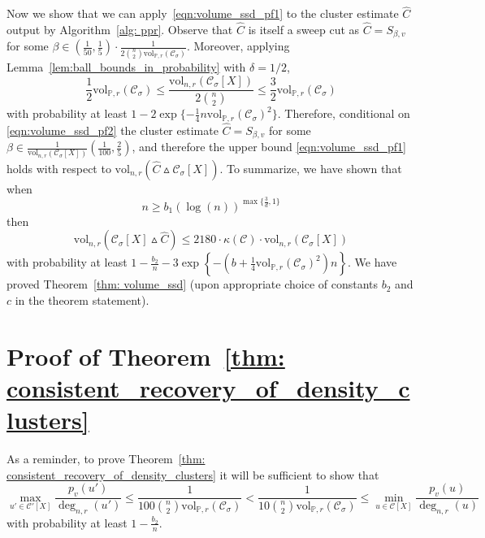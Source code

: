 \documentclass[11pt,twoside]{article}
\theoremstyle{definition}
\newcommand{\set}[1]{\left\{#1\right\}}
\newcommand{\vol}{\mathrm{vol}}
\newcommand{\1}{\mathbbm{1}}
\newcommand{\Xbf}{X}
\newcommand{\Pbb}{\mathbb{P}}
\newcommand{\Cset}{\mathcal{C}}
\newcommand{\Csig}{\Cset_{\sigma}}
\newcommand{\Cest}{\widehat{C}}
\begin{document}
Now we show that we can apply~\eqref{eqn:volume_ssd_pf1} to the cluster estimate $\Cest$ output by Algorithm~\ref{alg: ppr}. Observe that $\Cest$ is itself a sweep cut as $\Cest = S_{\beta,v}$ for some $\beta \in \left(\frac{1}{50},\frac{1}{5}\right)\cdot\frac{1}{2{n \choose 2}\vol_{\Pbb,r}(\Csig)}$. Moreover, applying  Lemma~\ref{lem:ball_bounds_in_probability} with $\delta = 1/2$,
\begin{equation}
\label{eqn:volume_ssd_pf2}
\frac{1}{2}\vol_{\Pbb,r}(\Csig) \leq \frac{\vol_{n,r}(\Csig[\Xbf])}{2{n \choose 2}} \leq \frac{3}{2}\vol_{\Pbb,r}(\Csig)
\end{equation}
with probability at least $1 - 2\exp\{-\frac{1}{4} n \vol_{\Pbb,r}(\Csig)^2\}$. Therefore, conditional on \eqref{eqn:volume_ssd_pf2} the cluster estimate $\Cest = S_{\beta,v}$ for some $\beta \in \frac{1}{\vol_{n,r}(\Csig[\Xbf])}\left(\frac{1}{100},\frac{2}{5}\right)$, and therefore the upper bound \eqref{eqn:volume_ssd_pf1} holds with respect to $\vol_{n,r}(\Cest \vartriangle \Csig[\Xbf])$. To summarize, we have shown that when
\begin{equation*}
n \geq b_1(\log(n))^{\max\{\frac{3}{d},1\}}
\end{equation*}
then
\begin{equation*}
\vol_{n,r}(\Csig[\Xbf] \vartriangle \Cest) \leq  2180 \cdot\kappa(\Cset)\cdot\vol_{n,r}(\Csig[\Xbf])
\end{equation*} 
with probability at least $1 - \frac{b_2}{n} - 3\exp\set{-(b + \frac{1}{4}\vol_{\Pbb,r}(\Csig)^2)n}$. We have proved Theorem~\ref{thm: volume_ssd} (upon appropriate choice of constants $b_2$ and $c$ in the theorem statement).

\section{Proof of Theorem~\ref{thm: consistent_recovery_of_density_clusters}}
\label{sec: proof_of_consistent_cluster_recovery}

As a reminder, to prove Theorem~\ref{thm: consistent_recovery_of_density_clusters} it will be sufficient to show that
\begin{equation}
\label{eqn: PPR_gap}
\max_{u' \in \Cset'[\Xbf]} \frac{p_v(u')}{\deg_{n,r}(u')} \leq \frac{1}{100 {n \choose 2} \vol_{\Pbb,r}(\Csig)} < \frac{1}{10 {n \choose 2} \vol_{\Pbb,r}(\Csig)} \leq \min_{u \in \Cset[\Xbf]} \frac{p_v(u)}{\deg_{n,r}(u)}
\end{equation}
with probability at least $1 - \frac{b_2}{n}$. 
\end{document}
